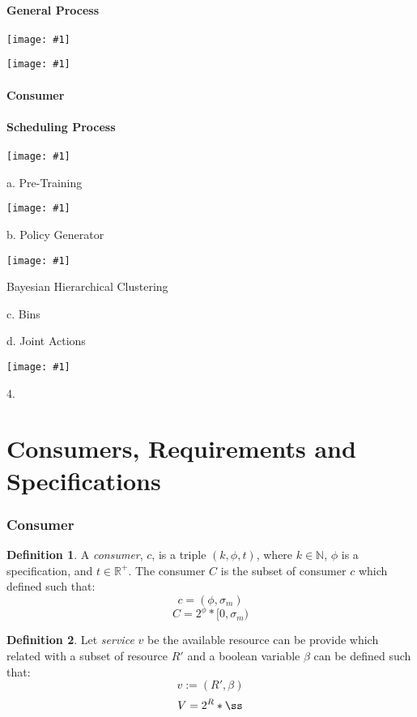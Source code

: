 \documentclass{article}
\theoremstyle{definition}
\newtheorem{definition}{Definition}[section]
\theoremstyle{remark}
\newcommand{\addpic}[1]{\texttt{[image: \#1]}}
\begin{document}
	\subsection{General Process}
	
	\addpic{Intro1.jpg}	
	
	\addpic{Intro2.jpg}
	

	\subsection{Consumer}
	
	
	
	\subsection{Scheduling Process}
	
	
	\addpic{Training2.jpg}
	
	
		a. Pre-Training
	
	\addpic{Pre-Train.jpg}
	
	
		b. Policy Generator
	
	\addpic{Policy.png}
	
	Bayesian Hierarchical Clustering
	
	c. Bins
	
	 d. Joint Actions
	
	\addpic{Joint-action.jpg}
	
	4.
	
	\newpage
	
	\part{Consumers, Requirements and Specifications}
	
	\section{Consumer}
	
		\begin{definition}
			A \emph{consumer}, $c$, is a triple $(k, \phi, t)$, where $k \in \mathbb{N}$, $\phi$ is a specification, and $t \in \mathbb{R}^{+}$. The consumer $C$ is the subset of consumer $c$ which defined such that:
			\[
			c = (\phi , \sigma_m)
			\]
			\[
			C = 2^{\phi}*[0,\sigma_m)
			\]
		\end{definition}
		
		\begin{definition}
			Let \emph{service} $v$ be the available resource can be provide which related with a subset of resource $R'$ and a boolean variable $\beta$ can be defined such that:
			\[
			v := (R', \beta)
			\]
			\[
			V = 2^{R}*{\ss}
			\]
		\end{definition}
	
\end{document}
